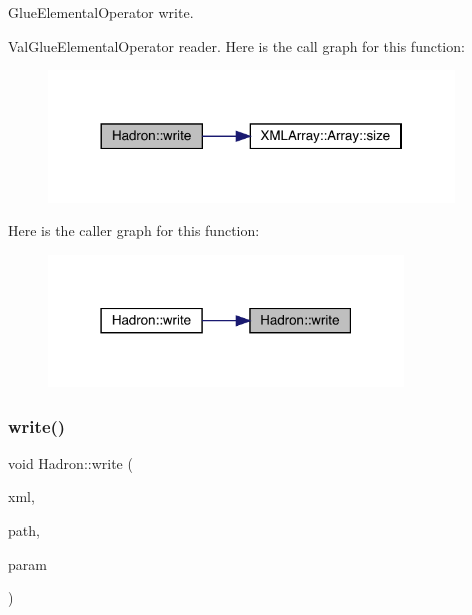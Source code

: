 Glue\+Elemental\+Operator write. 

Val\+Glue\+Elemental\+Operator reader. Here is the call graph for this function\+:
\nopagebreak
\begin{figure}[H]
\begin{center}
\leavevmode
\includegraphics[width=305pt]{d1/daf/namespaceHadron_aee7b5924c79af024abb8c3d99f7e8b34_cgraph}
\end{center}
\end{figure}
Here is the caller graph for this function\+:
\nopagebreak
\begin{figure}[H]
\begin{center}
\leavevmode
\includegraphics[width=267pt]{d1/daf/namespaceHadron_aee7b5924c79af024abb8c3d99f7e8b34_icgraph}
\end{center}
\end{figure}
\mbox{\label{namespaceHadron_aa7f9575393c93afa7db5f164da5c31eb}} 
\subsubsection{\texorpdfstring{write()}{write()}\hspace{0.1cm}{\footnotesize\ttfamily [66/95]}}
{\footnotesize\ttfamily void Hadron\+::write (\begin{DoxyParamCaption}\item[{\mbox{\hyperlink{classADATXML_1_1XMLWriter}{X\+M\+L\+Writer}} \&}]{xml,  }\item[{const std\+::string \&}]{path,  }\item[{const \mbox{\hyperlink{structHadron_1_1KeyHadronNode__t_1_1Quark__t}{Key\+Hadron\+Node\+\_\+t\+::\+Quark\+\_\+t}} \&}]{param }\end{DoxyParamCaption})}




